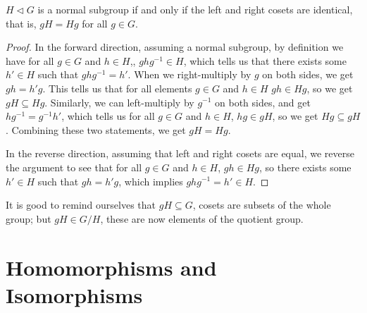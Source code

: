 \begin{theorem}\label{thm:equal-coset-normal}
    \(H \lhd G\) is a normal subgroup if and only if
    the left and right cosets are identical, that is,
    \(gH = Hg\) for all \(g \in G\).
\end{theorem}
\begin{proof}
    In the forward direction,
    assuming a normal subgroup,
    by definition we have for all \(g \in G\) and \(h \in H\),,
    \(ghg^{-1} \in H\),
    which tells us that there exists some \(h' \in H\)
    such that \(ghg^{-1} = h'\).
    When we right-multiply by \(g\) on both sides,
    we get \(gh = h'g\).
    This tells us that for all elements \(g \in G\) and \(h \in H\)
    \(gh \in Hg\), so we get \(gH \subseteq Hg\).
    Similarly, we can left-multiply by \(g^{-1}\) on both sides,
    and get \(hg^{-1} = g^{-1}h'\),
    which tells us for all \(g \in G\) and \(h \in H\),
    \(hg \in gH\), so we get \(Hg \subseteq gH\).
    Combining these two statements, we get \(gH = Hg\).

    In the reverse direction,
    assuming that left and right cosets are equal,
    we reverse the argument to see that
    for all \(g \in G\) and \(h \in H\),
    \(gh \in Hg\), so there exists some \(h' \in H\)
    such that \(gh = h'g\), which implies \(ghg^{-1} = h' \in H\).
\end{proof}

\begin{remark}
    It is good to remind ourselves that
    \(gH \subseteq G\), cosets are subsets of the whole group;
    but \(gH \in G/H\), these are now elements of the quotient group.
\end{remark}


\section{Homomorphisms and Isomorphisms}



